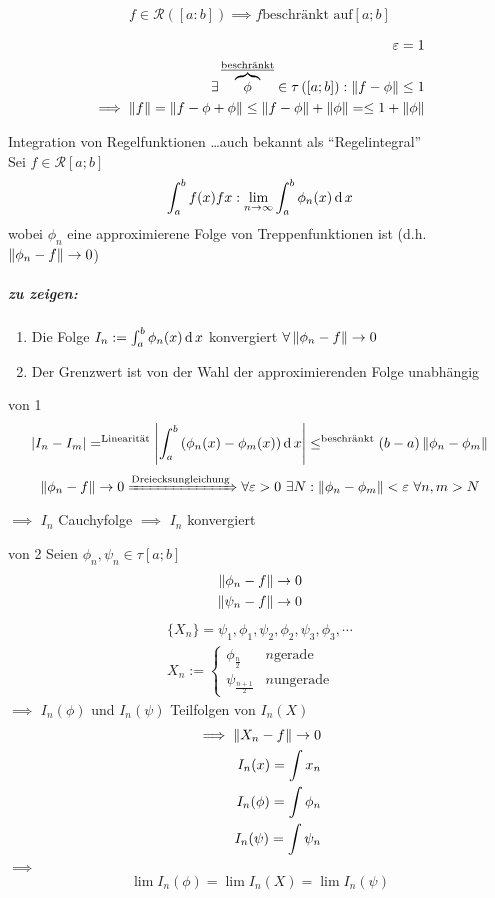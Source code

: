 \begin{Sat}
  \[f\in \mathcal{R}\left( [a:b] \right)\implies f \text{beschränkt auf} [a;b]\]
\end{Sat}
\begin{Bew}
  \begin{align*}
    \varepsilon =1\\
    \exists \overbrace{\phi}^{\text{\underline{beschränkt}}}\in\tau\left( [a;b] \right):\left\| f-\phi \right\|\leq 1\\
    \implies \left\| f \right\|=\left\| f-\phi + \phi \right\|\leq \left\| f-\phi \right\|+\left\| \phi \right\|=\leq 1+\left\| \phi \right\|
  \end{align*}
\end{Bew}
\begin{Def}{Integration von Regelfunktionen}
  \ldots auch bekannt als ``Regelintegral''\\
  Sei $f\in \mathcal{R}[a;b]$
  \[\int_a^bf(x)fx:\displaystyle\lim_{n\rightarrow\infty}\int^b_a\phi_n(x)\operatorname{d} x\]
  wobei $\phi_n$ eine approximierene Folge von Treppenfunktionen ist (d.h. $\left\| \phi_n-f \right\|\to 0$)
\end{Def}
\subparagraph{zu zeigen:}
\begin{enumerate}
  \item Die Folge $I_n:=\int^b_a\phi_n(x)\operatorname{d} x$ konvergiert $\forall \left\| \phi_n-f \right\|\to 0$
  \item Der Grenzwert ist von der Wahl der approximierenden Folge unabhängig
\end{enumerate}
\begin{Bew}{von 1}
  \[\left| I_n-I_m \right|=^{\text{Linearität}}\left| \int^b_a\left( \phi_n(x)-\phi_m(x) \right)\operatorname{d} x \right|\leq^{\text{beschränkt}} (b-a)\left\| \phi_n-\phi_m \right\|\]
  \[\Norm{\phi_n-f}\to 0 \xRightarrow{\text{Dreiecksungleichung}} \forall\varepsilon>0\ \exists N: \Norm{\phi_n-\phi_m}<\varepsilon\ \forall n,m> N\]
  $\implies$ $I_n$ Cauchyfolge $\implies$ $I_n$ konvergiert
\end{Bew}
\begin{Bew}{von 2}
  Seien $\phi_n, \psi_n\in \tau[a;b]$
  \begin{align*}
    \left\| \phi_n-f \right\|\to0\\
    \left\| \psi_n-f \right\|\to0
  \end{align*}
  \begin{align*}
    \{X_n\}=\psi_1,\phi_1,\psi_2,\phi_2,\psi_3,\phi_3,\cdots\\
    X_n:=\begin{cases}
      \phi_{\frac{n}{2}}& n \text{gerade}\\
      \psi_{\frac{n+1}{2}}& n \text{ungerade}
    \end{cases}
  \end{align*}
  $\implies$ $I_n(\phi)$ und $I_n(\psi)$ Teilfolgen von $I_n(X)$
  \begin{align*}
    \implies \left\| X_n-f \right\|\to 0\\
    I_n(x)=\int x_n\\ I_n(\phi)=\int \phi_n\\ I_n(\psi)=\int \psi_n\\
  \end{align*}
  $\implies$
  \begin{align*}
    \lim I_n(\phi)=\lim I_n(X)=\lim I_n(\psi)
  \end{align*}
\end{Bew}
